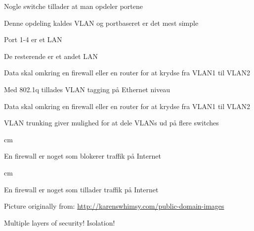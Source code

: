 \documentclass[Screen16to9,17pt]{foils}
\begin{document}


\begin{list1}
\item Nogle switche tillader at man opdeler portene
\item Denne opdeling kaldes VLAN og portbaseret er det mest simple
\item Port 1-4 er et LAN
\item De resterende er et andet LAN
\item Data skal omkring en firewall eller en router for at krydse fra VLAN1 til VLAN2
\end{list1}



\begin{list1}
\item Med 802.1q tillades VLAN tagging på Ethernet niveau
\item Data skal omkring en firewall eller en router for at krydse fra VLAN1 til VLAN2
\item VLAN trunking giver mulighed for at dele VLANs ud på flere switches
\end{list1}



 cm
\centerline{\hlkbig En firewall er noget som {\color{security6blue}blokerer}
  traffik på Internet}

 cm
\pause

\centerline{\hlkbig En firewall er noget som {\color{red}tillader}
  traffik på Internet}


\centerline{Picture originally from: \url{http://karenswhimsy.com/public-domain-images}}



\centerline{\hlkbig\color{security6blue} Multiple layers of security! Isolation!}






\end{document}
